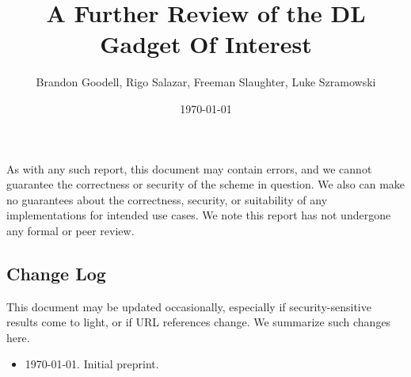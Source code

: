 \documentclass{article}
\title{A Further Review of the DL Gadget Of Interest}
\author{Brandon Goodell, Rigo Salazar, Freeman Slaughter, Luke Szramowski
}
\affil{$\mathsf{Cypher \ Stack}$}
\date{\today}
\theoremstyle{definition}
\newcommand{\6}{\mathbf}
\newcommand{\7}{\mathcal}
\begin{document}
\maketitle





As with any such report, this document may contain errors, and we cannot guarantee the correctness or security of the scheme in question.
We also can make no guarantees about the correctness, security, or suitability of any implementations for intended use cases.
We note this report has not undergone any formal or peer review.



\subsection*{Change Log}

This document may be updated occasionally, especially if security-sensitive results come to light, or if URL references change. We summarize such changes here.
\begin{itemize}
\item \today. Initial preprint.
\end{itemize}




\end{document}
